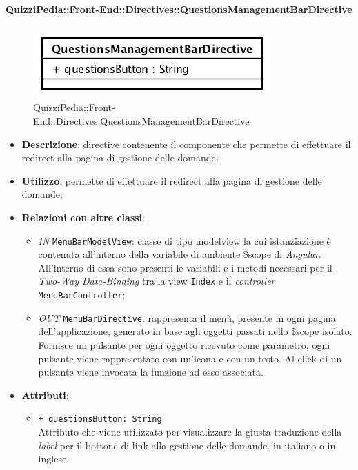 \paragraph[QuizziPedia::Front-End::Directives\\::QuestionsManagementBarDirective]{QuizziPedia::Front-End::Directives::QuestionsManagementBarDirective}

\label{QuizziPedia::Front-End::Directives::QuestionsManagementBarDirective}
\begin{figure} [ht]
	\centering
	\includegraphics[scale=0.80]{UML/Classi/Front-End/QuizziPedia_Front-end_Directives_QuestionsManagementBarDirective.png}
	\caption{QuizziPedia::Front-End::Directives:QuestionsManagementBarDirective}
\end{figure} \FloatBarrier
\begin{itemize}
	\item \textbf{Descrizione}: directive contenente il componente che permette di effettuare il redirect alla pagina di gestione delle domande;
	\item \textbf{Utilizzo}: permette di effettuare il redirect alla pagina di gestione delle domande;
	\item \textbf{Relazioni con altre classi}:
	\begin{itemize}
		\item \textit{IN} \texttt{MenuBarModelView}: classe di tipo modelview la cui istanziazione è contenuta all'interno della variabile di ambiente \$scope di \textit{Angular}. All'interno di essa sono presenti le variabili e i metodi necessari per il \textit{Two-Way Data-Binding} tra la view \texttt{Index} e il \textit{controller} \texttt{MenuBarController};
		\item \textit{OUT} \texttt{MenuBarDirective}: rappresenta il menù, presente in ogni pagina dell'applicazione, generato in base agli oggetti passati nello \$scope isolato. Fornisce un pulsante per ogni oggetto ricevuto come parametro, ogni pulsante viene rappresentato con un’icona e con un testo. Al click di un pulsante viene invocata la funzione ad esso associata.  
	\end{itemize}
	\item \textbf{Attributi}:
	\begin{itemize}
		\item \texttt{+ questionsButton: String} \\ Attributo che viene utilizzato per visualizzare la giusta traduzione della \textit{label} per il bottone di link alla gestione delle domande, in italiano o in inglese.
	\end{itemize}
\end{itemize}